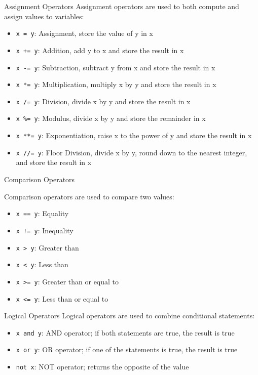 \documentclass[aspectratio=169]{beamer}
\begin{document}
\begin{frame}{Assignment Operators}
    Assignment operators are used to both compute and assign values to variables:
    \begin{itemize}
        \item \texttt{x = y}: Assignment, store the value of y in x
        \item \texttt{x += y}: Addition, add y to x and store the result in x
        \item \texttt{x -= y}: Subtraction, subtract y from x and store the result in x
        \item \texttt{x *= y}: Multiplication, multiply x by y and store the result in x
        \item \texttt{x /= y}: Division, divide x by y and store the result in x
        \item \texttt{x \%= y}: Modulus, divide x by y and store the remainder in x
        \item \texttt{x **= y}: Exponentiation, raise x to the power of y and store the result in x
        \item \texttt{x //= y}: Floor Division, divide x by y, round down to the nearest integer, and store the result in x
    \end{itemize}
\end{frame}

\begin{frame}{Comparison Operators}

    Comparison operators are used to compare two values:
    \begin{itemize}
        \item \texttt{x == y}: Equality
        \item \texttt{x != y}: Inequality
        \item \texttt{x > y}: Greater than
        \item \texttt{x < y}: Less than
        \item \texttt{x >= y}: Greater than or equal to
        \item \texttt{x <= y}: Less than or equal to
    \end{itemize}
\end{frame}

\begin{frame}{Logical Operators}
    Logical operators are used to combine conditional statements:
    \begin{itemize}
        \item \texttt{x and y}: AND operator; if both statements are true, the result is true
        \item \texttt{x or y}: OR operator; if one of the statements is true, the result is true
        \item \texttt{not x}: NOT operator; returns the opposite of the value
    \end{itemize}
\end{frame}
\end{document}
